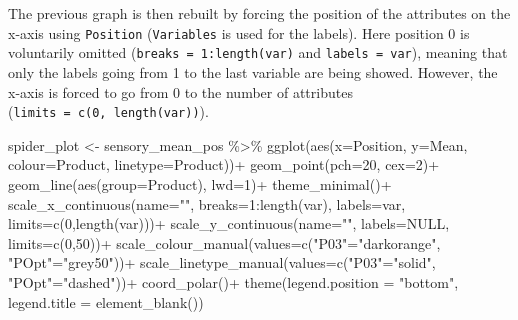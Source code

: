 \documentclass[
]{krantz}
\makeatletter
\newenvironment{Shaded}{\begin{snugshade}}{\end{snugshade}}
\newcommand{\AttributeTok}[1]{\textcolor[rgb]{0.61,0.61,0.61}{#1}}
\newcommand{\ConstantTok}[1]{\textcolor[rgb]{0,0,0}{#1}}
\newcommand{\DecValTok}[1]{\textcolor[rgb]{0.06,0.06,0.06}{#1}}
\newcommand{\FunctionTok}[1]{\textcolor[rgb]{0,0,0}{#1}}
\newcommand{\NormalTok}[1]{#1}
\newcommand{\OtherTok}[1]{\textcolor[rgb]{0.37,0.37,0.37}{#1}}
\newcommand{\SpecialCharTok}[1]{\textcolor[rgb]{0,0,0}{#1}}
\newcommand{\StringTok}[1]{\textcolor[rgb]{0.5,0.5,0.5}{#1}}
\newenvironment{kframe}{%
\medskip{}
\setlength{\fboxsep}{.8em}
 \def\at@end@of@kframe{}%
 \ifinner\ifhmode%
  \def\at@end@of@kframe{\end{minipage}}%
  \begin{minipage}{\columnwidth}%
 \fi\fi%
 \def\FrameCommand##1{\hskip\@totalleftmargin \hskip-\fboxsep
 \colorbox{shadecolor}{##1}\hskip-\fboxsep
     \hskip-\linewidth \hskip-\@totalleftmargin \hskip\columnwidth}%
 \MakeFramed {\advance\hsize-\width
   \@totalleftmargin\z@ \linewidth\hsize
   \@setminipage}}%
 {\par\unskip\endMakeFramed%
 \at@end@of@kframe}
\renewenvironment{Shaded}{\begin{kframe}}{\end{kframe}}
\makeatother
\begin{document}
The previous graph is then rebuilt by forcing the position of the attributes on the x-axis using \texttt{Position} (\texttt{Variables} is used for the labels). Here position 0 is voluntarily omitted (\texttt{breaks\ =\ 1:length(var)} and \texttt{labels\ =\ var}), meaning that only the labels going from 1 to the last variable are being showed. However, the x-axis is forced to go from 0 to the number of attributes (\texttt{limits\ =\ c(0,\ length(var))}).

\begin{Shaded}
\begin{Highlighting}[]
\NormalTok{spider\_plot }\OtherTok{\textless{}{-}}\NormalTok{ sensory\_mean\_pos }\SpecialCharTok{\%\textgreater{}\%} 
  \FunctionTok{ggplot}\NormalTok{(}\FunctionTok{aes}\NormalTok{(}\AttributeTok{x=}\NormalTok{Position, }\AttributeTok{y=}\NormalTok{Mean, }\AttributeTok{colour=}\NormalTok{Product, }\AttributeTok{linetype=}\NormalTok{Product))}\SpecialCharTok{+}
  \FunctionTok{geom\_point}\NormalTok{(}\AttributeTok{pch=}\DecValTok{20}\NormalTok{, }\AttributeTok{cex=}\DecValTok{2}\NormalTok{)}\SpecialCharTok{+}
  \FunctionTok{geom\_line}\NormalTok{(}\FunctionTok{aes}\NormalTok{(}\AttributeTok{group=}\NormalTok{Product), }\AttributeTok{lwd=}\DecValTok{1}\NormalTok{)}\SpecialCharTok{+}
  \FunctionTok{theme\_minimal}\NormalTok{()}\SpecialCharTok{+}
  \FunctionTok{scale\_x\_continuous}\NormalTok{(}\AttributeTok{name=}\StringTok{""}\NormalTok{, }\AttributeTok{breaks=}\DecValTok{1}\SpecialCharTok{:}\FunctionTok{length}\NormalTok{(var), }
                     \AttributeTok{labels=}\NormalTok{var, }\AttributeTok{limits=}\FunctionTok{c}\NormalTok{(}\DecValTok{0}\NormalTok{,}\FunctionTok{length}\NormalTok{(var)))}\SpecialCharTok{+}
  \FunctionTok{scale\_y\_continuous}\NormalTok{(}\AttributeTok{name=}\StringTok{""}\NormalTok{, }\AttributeTok{labels=}\ConstantTok{NULL}\NormalTok{, }\AttributeTok{limits=}\FunctionTok{c}\NormalTok{(}\DecValTok{0}\NormalTok{,}\DecValTok{50}\NormalTok{))}\SpecialCharTok{+}
  \FunctionTok{scale\_colour\_manual}\NormalTok{(}\AttributeTok{values=}\FunctionTok{c}\NormalTok{(}\StringTok{"P03"}\OtherTok{=}\StringTok{"darkorange"}\NormalTok{, }\StringTok{"POpt"}\OtherTok{=}\StringTok{"grey50"}\NormalTok{))}\SpecialCharTok{+}
  \FunctionTok{scale\_linetype\_manual}\NormalTok{(}\AttributeTok{values=}\FunctionTok{c}\NormalTok{(}\StringTok{"P03"}\OtherTok{=}\StringTok{"solid"}\NormalTok{, }\StringTok{"POpt"}\OtherTok{=}\StringTok{"dashed"}\NormalTok{))}\SpecialCharTok{+}
  \FunctionTok{coord\_polar}\NormalTok{()}\SpecialCharTok{+}
  \FunctionTok{theme}\NormalTok{(}\AttributeTok{legend.position =} \StringTok{"bottom"}\NormalTok{, }\AttributeTok{legend.title =} \FunctionTok{element\_blank}\NormalTok{())}
\end{Highlighting}
\end{Shaded}
\end{document}

